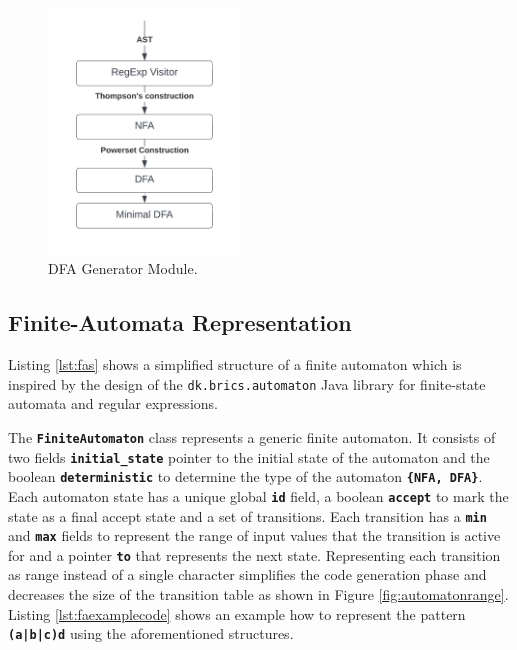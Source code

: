 \begin{figure}[htpb]
\centering
\includegraphics[width=0.45\textwidth]{imgs/sa2.png}
\caption[DFA Generator]{DFA Generator Module.}\label{fig:sa2}
\end{figure}

\subsection{Finite-Automata Representation}
Listing \ref{lst:fas} shows a simplified structure of a finite automaton which is inspired by the design of the \texttt{dk.brics.automaton}\cite{dk} Java library for finite-state automata and regular expressions.

The \texttt{\textbf{FiniteAutomaton}} class represents a generic finite automaton. It consists of two fields \texttt{\textbf{initial\_state}} pointer to the initial state of the automaton and the boolean \texttt{\textbf{deterministic}} to determine the type of the automaton \texttt{\textbf{\{NFA, DFA\}}}. Each automaton state has a unique global \texttt{\textbf{id}} field, a boolean \texttt{\textbf{accept}} to mark the state as a final accept state and a set of transitions. Each transition has a \texttt{\textbf{min}} and \texttt{\textbf{max}} fields to represent the range of input values that the transition is active for and a pointer \texttt{\textbf{to}} that represents the next state. Representing each transition as range instead of a single character simplifies the code generation phase and decreases the size of the transition table as shown in Figure \ref{fig:automatonrange}. Listing  \ref{lst:faexamplecode} shows an example how to represent the pattern \texttt{\textbf{(a|b|c)d}} using the aforementioned structures.

